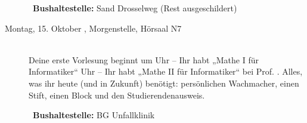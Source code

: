\begin{description}
~\textbf{Bushaltestelle:} Sand Drosselweg (Rest ausgeschildert)

\ifbachelor
\item[Montag, 15. Oktober \Jahr, Morgenstelle, Hörsaal N7]\ \\
Deine erste Vorlesung beginnt um 
 Uhr -- Ihr habt „Mathe I für Informatiker“  \fi
{} Uhr -- Ihr habt „Mathe II für Informatiker“  \fi
bei Prof. \Matheprof.
Alles, was ihr heute (und in Zukunft) benötigt: persönlichen Wachmacher, einen Stift, einen Block und den Studierendenausweis.

~\textbf{Bushaltestelle:} BG Unfallklinik
\fi






% 
%




\end{description}

